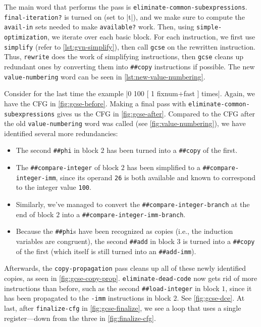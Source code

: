 \begin{sloppypar}
The main word that performs the pass is \Verb|eliminate-common-subexpressions|.
\Verb|final-iteration?| is turned on (set to \factor|t|), and we make sure to
compute the \Verb|avail-in| sets needed to make \Verb|available?| work.  Then,
using \Verb|simple-optimization|, we iterate over each basic block.  For each
instruction, we first use \Verb|simplify| (refer to \vref{lst:gvn-simplify}),
then call \Verb|gcse| on the rewritten instruction.  Thus, \Verb|rewrite| does
the work of simplifying instructions, then \Verb|gcse| cleans up redundant ones
by converting them into \Verb|##copy| instructions if possible.  The new
\Verb|value-numbering| word can be seen in \vref{lst:new-value-numbering}.
\end{sloppypar}


\begin{sloppypar}
Consider for the last time the example
%
\factor|0 100 [ 1 fixnum+fast ] times|.
%
Again, we have the \gls{CFG} in \vref{fig:gcse-before}.  Making a final pass
with \Verb|eliminate-common-subexpressions| gives us the \gls{CFG} in
\vref{fig:gcse-after}.  Compared to the \gls{CFG} after the old
\Verb|value-numbering| word was called (see \vref{fig:value-numbering}), we
have identified several more redundancies:
\begin{itemize}
  \item The second \Verb|##phi| in block $2$ has been turned into a
  \Verb|##copy| of the first.
%
  \item The \Verb|##compare-integer| of block $2$ has been simplified to
  a \Verb|##compare-integer-imm|, since its operand \Verb|26| is both
  available and known to correspond to the integer value \Verb|100|.
%
  \item Similarly, we've managed to convert the \Verb|##compare-integer-branch|
  at the end of block $2$ into a \Verb|##compare-integer-imm-branch|.
%
  \item Because the \Verb|##phi|s have been recognized as copies (i.e., the
  induction variables are congruent), the second \Verb|##add| in block $3$ is
  turned into a \Verb|##copy| of the first (which itself is still turned into
  an \Verb|##add-imm|).
\end{itemize}
\end{sloppypar}


Afterwards, the \Verb|copy-propagation| pass cleans up all of these newly
identified copies, as seen in \vref{fig:gcse-copy-prop}.
\Verb|eliminate-dead-code| now gets rid of more instructions than before, such
as the second \Verb|##load-integer| in block $1$, since it has been propagated
to the \Verb|-imm| instructions in block $2$.  See \vref{fig:gcse-dce}.  At
last, after \Verb|finalize-cfg| in \vref{fig:gcse-finalize}, we see a loop that
uses a single register---down from the three in \vref{fig:finalize-cfg}.

\clearpage
